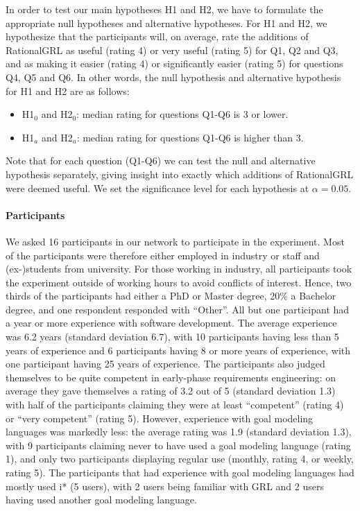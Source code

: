 In order to test our main hypotheses H1 and H2, we have to formulate the appropriate null hypotheses and alternative hypotheses. For H1 and H2, we hypothesize that the participants will, on average, rate the additions of RationalGRL as useful (rating 4) or very useful (rating 5) for Q1, Q2 and Q3, and as making it easier (rating 4) or significantly easier (rating 5) for questions Q4, Q5 and Q6. In other words, the null hypothesis and alternative hypothesis for H1 and H2 are as follows:
\begin{itemize}
\item H1$_{0}$ and H2$_{0}$: median rating for questions Q1-Q6 is 3 or lower.
\item H1$_{a}$ and H2$_{a}$: median rating for questions Q1-Q6 is higher than 3.
\end{itemize}
Note that for each question (Q1-Q6) we can test the null and alternative hypothesis separately, giving insight into exactly which additions of RationalGRL were deemed useful. We set the significance level for each hypothesis at $\alpha = 0.05$.

\paragraph{Participants}
We asked 16 participants in our network to participate in the experiment. Most of the participants were therefore either employed in industry or staff and (ex-)students from university. For those working in industry, all participants took the experiment outside of working hours to avoid conflicts of interest. Hence, two thirds of the participants had either a PhD or Master degree, 20\% a Bachelor degree, and one respondent responded with ``Other''. All but one participant had a year or more experience with software development. The average experience was 6.2 years (standard deviation 6.7), with 10 participants having less than 5 years of experience and 6 participants having 8 or more years of experience, with one participant having 25 years of experience. The participants also judged themselves to be quite competent in  early-phase requirements engineering: on average they gave themselves a rating of 3.2 out of 5 (standard deviation 1.3) with half of the participants claiming they were at least ``competent'' (rating 4) or ``very competent'' (rating 5). However, experience with goal modeling languages was markedly less: the average rating was 1.9 (standard deviation 1.3), with 9 participants claiming never to have used a goal modeling language (rating 1), and only two participants displaying regular use (monthly, rating 4, or weekly, rating 5). The participants that had experience with goal modeling languages had mostly used i* (5 users), with 2 users being familiar with GRL and 2 users having used another goal modeling language.

